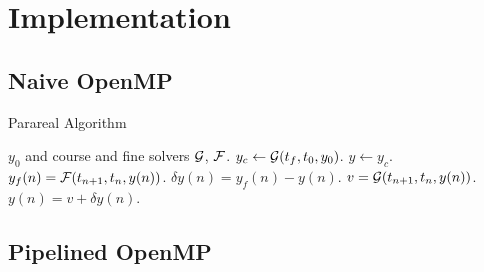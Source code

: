 \section{Implementation}

\subsection{Naive OpenMP}

\begin{algorithm}
  \caption{Parareal Algorithm}
  \label{alg:parareal}
  \begin{algorithmic}
    \Require $y_0$ and course and fine solvers $\mathcal{G}$, $\mathcal{F}$.
    \State $y_c \gets \mathcal{G}(t_f, t_0, y_0)$.
    \State $y \gets y_c$.
        \State $y_f(n) = \mathcal{F}(t_{n+1},t_n,y(n))$.
        \State $\delta y(n) = y_f(n) - y(n)$.
      \EndFor
        \State $v = \mathcal{G}(t_{n+1},t_n,y(n))$.
        \State $y(n) = v + \delta y(n)$.
      \EndFor
    \EndWhile
  \end{algorithmic}
\end{algorithm}

\subsection{Pipelined OpenMP}
